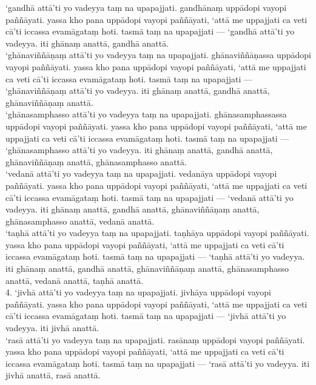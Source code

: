 \documentclass[10pt]{article}
\begin{document}
‘gandhā attā’ti yo vadeyya taṃ na upapajjati. gandhānaṃ uppādopi vayopi paññāyati. yassa kho pana uppādopi vayopi paññāyati, ‘attā me uppajjati ca veti cā’ti iccassa evamāgataṃ hoti. tasmā taṃ na upapajjati — ‘gandhā attā’ti yo vadeyya. iti ghānaṃ anattā, gandhā anattā.\\

‘ghānaviññāṇaṃ attā’ti yo vadeyya taṃ na upapajjati. ghānaviññāṇassa uppādopi vayopi paññāyati. yassa kho pana uppādopi vayopi paññāyati, ‘attā me uppajjati ca veti cā’ti iccassa evamāgataṃ hoti. tasmā taṃ na upapajjati — ‘ghānaviññāṇaṃ attā’ti yo vadeyya. iti ghānaṃ anattā, gandhā anattā, ghānaviññāṇaṃ anattā.\\

‘ghānasamphasso attā’ti yo vadeyya taṃ na upapajjati. ghānasamphassassa uppādopi vayopi paññāyati. yassa kho pana uppādopi vayopi paññāyati, ‘attā me uppajjati ca veti cā’ti iccassa evamāgataṃ hoti. tasmā taṃ na upapajjati — ‘ghānasamphasso attā’ti yo vadeyya. iti ghānaṃ anattā, gandhā anattā, ghānaviññāṇaṃ anattā, ghānasamphasso anattā.\\

‘vedanā attā’ti yo vadeyya taṃ na upapajjati. vedanāya uppādopi vayopi paññāyati. yassa kho pana uppādopi vayopi paññāyati, ‘attā me uppajjati ca veti cā’ti iccassa evamāgataṃ hoti. tasmā taṃ na upapajjati — ‘vedanā attā’ti yo vadeyya. iti ghānaṃ anattā, gandhā anattā, ghānaviññāṇaṃ anattā, ghānasamphasso anattā, vedanā anattā.\\

‘taṇhā attā’ti yo vadeyya taṃ na upapajjati. taṇhāya uppādopi vayopi paññāyati. yassa kho pana uppādopi vayopi paññāyati, ‘attā me uppajjati ca veti cā’ti iccassa evamāgataṃ hoti. tasmā taṃ na upapajjati — ‘taṇhā attā’ti yo vadeyya. iti ghānaṃ anattā, gandhā anattā, ghānaviññāṇaṃ anattā, ghānasamphasso anattā, vedanā anattā, taṇhā anattā.\\

4. ‘jivhā attā’ti yo vadeyya taṃ na upapajjati. jivhāya uppādopi vayopi paññāyati. yassa kho pana uppādopi vayopi paññāyati, ‘attā me uppajjati ca veti cā’ti iccassa evamāgataṃ hoti. tasmā taṃ na upapajjati — ‘jivhā attā’ti yo vadeyya. iti jivhā anattā.\\

‘rasā attā’ti yo vadeyya taṃ na upapajjati. rasānaṃ uppādopi vayopi paññāyati. yassa kho pana uppādopi vayopi paññāyati, ‘attā me uppajjati ca veti cā’ti iccassa evamāgataṃ hoti. tasmā taṃ na upapajjati — ‘rasā attā’ti yo vadeyya. iti jivhā anattā, rasā anattā.\\
\end{document}
